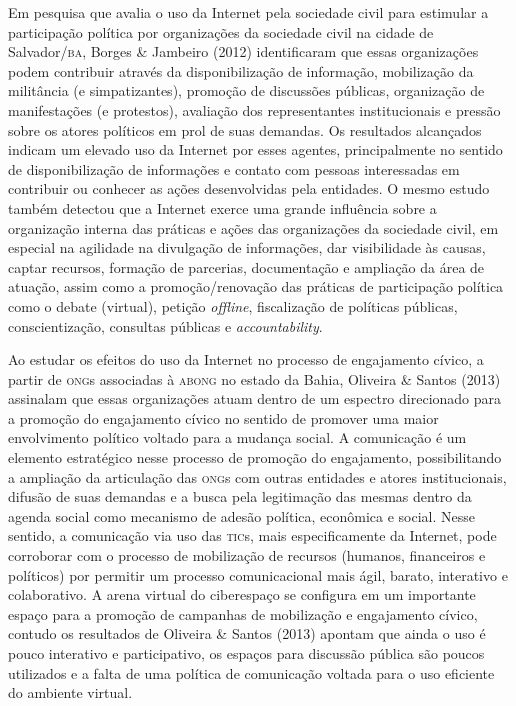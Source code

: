 Em pesquisa que avalia o uso da Internet pela sociedade civil para
estimular a participação política por organizações da sociedade civil na
cidade de Salvador/\textsc{ba}, Borges \& Jambeiro (2012) identificaram que essas
organizações podem contribuir através da disponibilização de informação,
mobilização da militância (e simpatizantes), promoção de discussões
públicas, organização de manifestações (e protestos), avaliação dos
representantes institucionais e pressão sobre os atores políticos em
prol de suas demandas. Os resultados alcançados indicam um elevado uso
da Internet por esses agentes, principalmente no sentido de
disponibilização de informações e contato com pessoas interessadas em
contribuir ou conhecer as ações desenvolvidas pela entidades. O mesmo
estudo também detectou que a Internet exerce uma grande influência sobre
a organização interna das práticas e ações das organizações da sociedade
civil, em especial na agilidade na divulgação de informações, dar
visibilidade às causas, captar recursos, formação de parcerias,
documentação e ampliação da área de atuação, assim como a
promoção/renovação das práticas de participação política como o debate
(virtual), petição \emph{offline}, fiscalização de políticas públicas,
conscientização, consultas públicas e \emph{accountability}.

Ao estudar os efeitos do uso da Internet no processo de engajamento
cívico, a partir de \textsc{ong}s associadas à \textsc{abong} no estado da Bahia, Oliveira
\& Santos (2013) assinalam que essas organizações atuam dentro de um
espectro direcionado para a promoção do engajamento cívico no sentido de
promover uma maior envolvimento político voltado para a mudança social.
A comunicação é um elemento estratégico nesse processo de promoção do
engajamento, possibilitando a ampliação da articulação das \textsc{ong}s com
outras entidades e atores institucionais, difusão de suas demandas e a
busca pela legitimação das mesmas dentro da agenda social como mecanismo
de adesão política, econômica e social. Nesse sentido, a comunicação via
uso das \textsc{tic}s, mais especificamente da Internet, pode corroborar com o
processo de mobilização de recursos (humanos, financeiros e políticos)
por permitir um processo comunicacional mais ágil, barato, interativo e
colaborativo. A arena virtual do ciberespaço se configura em um
importante espaço para a promoção de campanhas de mobilização e
engajamento cívico, contudo os resultados de Oliveira \& Santos (2013)
apontam que ainda o uso é pouco interativo e participativo, os espaços
para discussão pública são poucos utilizados e a falta de uma política
de comunicação voltada para o uso eficiente do ambiente virtual.

